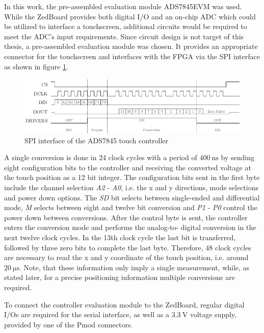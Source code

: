 In this work, the pre-assembled evaluation module ADS7845EVM \citep{ADS06} was
used. While the ZedBoard provides both digital I/O and an on-chip \ac{ADC}
which could be utilized to interface a touchscreen, additional circuits would
be required to meet the \ac{ADC}'s input requirements. Since circuit design is
not target of this thesis, a pre-assembled evaluation module was chosen. It
provides an appropriate connector for the touchscreen and interfaces with the
\ac{FPGA} via the \ac{SPI} interface as shown in figure \ref{fig:touch_spi}.
\begin{figure}
	\centering
	\includegraphics{../figures/touch_spi}
	\caption{\acs{SPI} interface of the ADS7845 touch controller \citep[adapted from][]{ADST06}}
	\label{fig:touch_spi}
\end{figure}
A single conversion is done in 24 clock cycles with a period of
$\SI{400}{\nano\second}$ by sending eight configuration bits to the controller
and receiving the converted voltage at the touch position as a 12 bit integer.
The configuration bits sent in the first byte include the channel selection
\emph{A2} - \emph{A0}, i.e. the x and y directions, mode selections and power
down options. The \emph{SD} bit selects between single-ended and differential
mode, \emph{M} selects between eight and twelve bit conversion and \emph{P1} -
\emph{P0} control the power down between conversions. After the control byte
is sent, the controller enters the conversion mode and performs the analog-to-
digital conversion in the next twelve clock cycles. In the 13th clock cycle
the last bit is transferred, followed by three zero bits to complete the last
byte. Therefore, 48 clock cycles are necessary to read the x and y coordinate
of the touch position, i.e. around $\SI{20}{\micro\second}$. Note, that these
information only imply a single measurement, while, as stated later, for a
precise positioning information multiple conversions are required.

To connect the controller evaluation module to the ZedBoard, regular digital
I/Os are required for the serial interface, as well as a $\SI{3.3}{\volt}$
voltage supply, provided by one of the \ac{Pmod} connectors.

